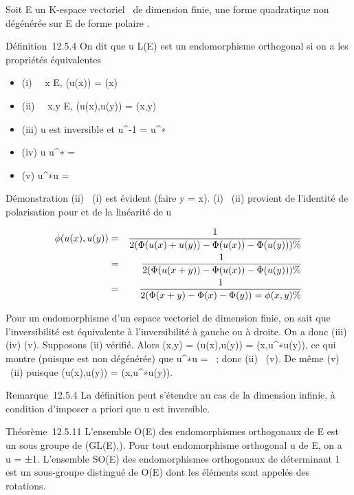 Soit E un K-espace vectoriel ~de dimension finie, \Phi une forme
quadratique non dégénérée sur E de forme polaire \phi.

Définition~12.5.4 On dit que u \in L(E) est un endomorphisme orthogonal si
on a les propriétés équivalentes

\begin{itemize}
\itemsep1pt\parskip0pt
\item
  (i) \forall~~x \in E, \Phi(u(x)) = \Phi(x)
\item
  (ii) \forall~~x,y \in E, \phi(u(x),u(y)) = \phi(x,y)
\item
  (iii) u est inversible et u^-1 = u^∗
\item
  (iv) u \cdot u^∗ = \mathrmIdE
\item
  (v) u^∗\cdot u = \mathrmIdE
\end{itemize}

Démonstration (ii) \rigtharrow~(i) est évident (faire y = x). (i) \rigtharrow~(ii) provient de
l'identité de polarisation pour \Phi et de la linéarité de u

\begin{align*} \phi(u(x),u(y))& =& 1
\over 2 (\Phi(u(x) + u(y)) - \Phi(u(x)) - \Phi(u(y)))\%&
\\ & =& 1 \over 2
(\Phi(u(x + y)) - \Phi(u(x)) - \Phi(u(y))) \%& \\
& =& 1 \over 2 (\Phi(x + y) - \Phi(x) - \Phi(y)) = \phi(x,y)
\%& \\ \end{align*}

Pour un endomorphisme d'un espace vectoriel de dimension finie, on sait
que l'inversibilité est équivalente à l'inversibilité à gauche ou à
droite. On a donc (iii) \Leftrightarrow (iv)
\Leftrightarrow (v). Supposons (ii) vérifié. Alors \phi(x,y) =
\phi(u(x),u(y)) = \phi(x,u^∗\cdot u(y)), ce qui montre (puisque \phi est
non dégénérée) que u^∗\cdot u =
\mathrmIdE~; donc (ii) \rigtharrow~(v). De même (v)
\rigtharrow~(ii) puisque \phi(u(x),u(y)) = \phi(x,u^∗\cdot u(y)).

Remarque~12.5.4 La définition peut s'étendre au cas de la dimension
infinie, à condition d'imposer a priori que u est inversible.

Théorème~12.5.11 L'ensemble O\Phi(E) des endomorphismes
orthogonaux de E est un sous groupe de (GL(E),\cdot). Pour tout
endomorphisme orthogonal u de E, on a
~ u = ±1.
L'ensemble SO\Phi(E) des endomorphismes orthogonaux de
déterminant 1 est un sous-groupe distingué de O\Phi(E) dont les
éléments sont appelés des rotations.

